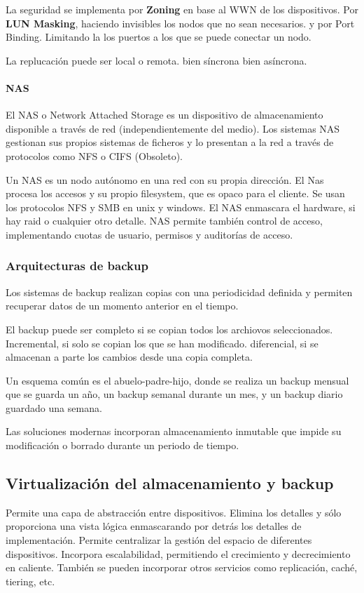             La seguridad se implementa por \textbf{Zoning} en base al WWN de los dispositivos. Por \textbf{LUN Masking}, haciendo invisibles los nodos que no sean necesarios. y por Port Binding. Limitando la los puertos a los que se puede conectar un nodo.

            La replucación puede ser local o remota. bien síncrona bien asíncrona.

        \paragraph{NAS}
            El NAS o Network Attached Storage es un dispositivo de almacenamiento disponible a través de red (independientemente del medio). Los sistemas NAS gestionan sus propios sistemas de ficheros y lo presentan a la red a través de protocolos como NFS o CIFS (Obsoleto).

            Un NAS es un nodo autónomo en una red con su propia dirección. El Nas procesa los accesos y su propio filesystem, que es opaco para el cliente. Se usan los protocolos NFS y SMB en unix y windows. El NAS enmascara el hardware, si hay raid o cualquier otro detalle. NAS permite también control de acceso, implementando cuotas de usuario, permisos y auditorías de acceso.

    \subsubsection{Arquitecturas de backup}

        Los sistemas de backup realizan copias con una periodicidad definida y permiten recuperar datos  de un momento anterior en el tiempo.

        El backup puede ser completo si se copian todos los archiovos seleccionados. Incremental, si solo se copian los que se han modificado. diferencial, si se almacenan a parte los cambios desde una copia completa.

        Un esquema común es el abuelo-padre-hijo, donde se realiza un backup mensual que se guarda un año, un backup semanal durante un mes, y un backup diario guardado una semana.

        Las soluciones modernas incorporan almacenamiento inmutable que impide su modificación o borrado durante un periodo de tiempo.

\subsection{Virtualización del almacenamiento y backup}
    Permite una capa de abstracción entre dispositivos. Elimina los detalles y sólo proporciona una vista lógica enmascarando por detrás los detalles de implementación. Permite centralizar la gestión del espacio de diferentes dispositivos. Incorpora escalabilidad, permitiendo el crecimiento y decrecimiento en caliente. También se pueden incorporar otros servicios como replicación, caché, tiering, etc.

